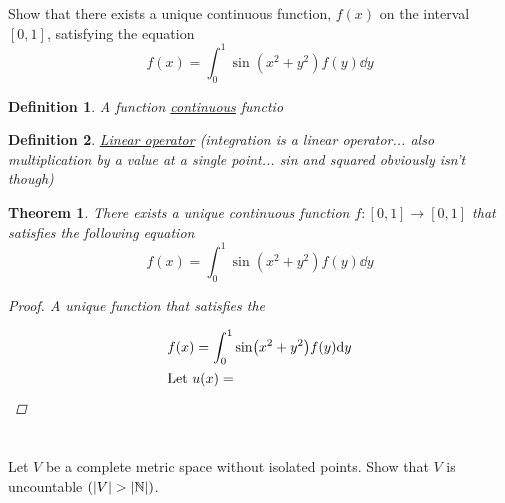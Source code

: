 \documentclass[]{article}
\newcommand{\N}{\mathbb{N}}
\newtheorem{definition}{Definition}
\newtheorem{theorem}{Theorem}
\begin{document}
\newpage
\section{}
Show that there exists a unique continuous function, 
$f(x)$ on the interval $[0,1]$,
satisfying the equation
\[
    f(x) = \int_{0}^{1} \sin(x^2 + y^ 2) f(y) \dd y
\]


\begin{definition}
    A function \emph{\underline{continuous}} functio
\end{definition}

\begin{definition}
    \emph{\underline{Linear operator}} (integration is a linear operator... also multiplication by a value at a single point... sin and squared obviously isn't though)
\end{definition}


\begin{theorem}
    There exists a unique continuous function $f : [0,1] \to [0,1]$
    that satisfies the following equation
    \begin{equation}\label{eq:pblm5}
        f(x) = \int_{0}^{1} \sin(x^2 + y^ 2) f(y) \dd y
    \end{equation}
    \begin{proof}
        A unique function that satisfies the


        \begin{align*}
            f(x) &= \int_{0}^{1} \sin(x^2 + y^2) f(y) \dd y\\
            \intertext{Let $u(x) = $}
        \end{align*}


    \end{proof}
\end{theorem}
















\newpage
\section{}
Let $V$ be a complete metric space without isolated points.
Show that $V$ is uncountable $(\abs{V} > \abs{\N})$.
\end{document}
